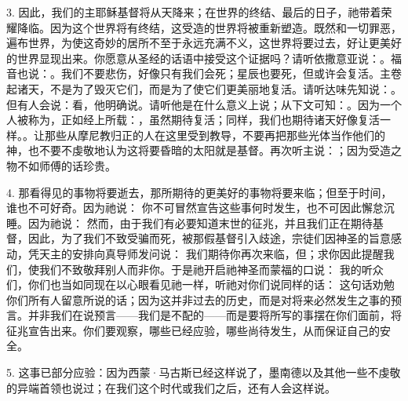 3. 因此，我们的主耶稣基督将从天降来；在世界的终结、最后的日子，祂带着荣耀降临。因为这个世界将有终结，这受造的世界将被重新塑造。既然和一切罪恶，遍布世界，为使这奇妙的居所不至于永远充满不义，这世界将要过去，好让更美好的世界显现出来。你愿意从圣经的话语中接受这个证据吗？请听依撒意亚说：。福音也说：。我们不要悲伤，好像只有我们会死；星辰也要死，但或许会复活。主卷起诸天，不是为了毁灭它们，而是为了使它们更美丽地复活。请听达味先知说：。但有人会说：看，他明确说。请听他是在什么意义上说；从下文可知：。因为一个人被称为，正如经上所载：，虽然期待复活；同样，我们也期待诸天好像复活一样。。让那些从摩尼教归正的人在这里受到教导，不要再把那些光体当作他们的神，也不要不虔敬地认为这将要昏暗的太阳就是基督。再次听主说：；因为受造之物不如师傅的话珍贵。\par

4. 那看得见的事物将要逝去，那所期待的更美好的事物将要来临；但至于时间，谁也不可好奇。因为祂说：  你不可冒然宣告这些事何时发生，也不可因此懈怠沉睡。因为祂说： 然而，由于我们有必要知道末世的征兆，并且我们正在期待基督，因此，为了我们不致受骗而死，被那假基督引入歧途，宗徒们因神圣的旨意感动，凭天主的安排向真导师发问说： 我们期待你再次来临，但；求你因此提醒我们，使我们不致敬拜别人而非你。于是祂开启祂神圣而蒙福的口说： 我的听众们，你们也当如同现在以心眼看见祂一样，听祂对你们说同样的话： 这句话劝勉你们所有人留意所说的话；因为这并非过去的历史，而是对将来必然发生之事的预言。并非我们在说预言——我们是不配的——而是要将所写的事摆在你们面前，将征兆宣告出来。你们要观察，哪些已经应验，哪些尚待发生，从而保证自己的安全。\par

5.  这事已部分应验：因为西蒙·马古斯已经这样说了，墨南德以及其他一些不虔敬的异端首领也说过；在我们这个时代或我们之后，还有人会这样说。\par

